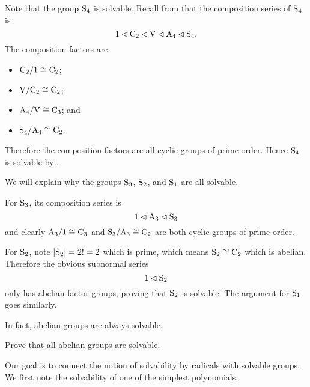 \begin{example}
    Note that the group $\mathrm{S}_{4}$ is solvable. Recall from   that the composition series of $\mathrm{S}_{4}$ is
    \[
        1 \lhd \mathrm{C}_{2} \lhd \mathrm{V} \lhd \mathrm{A}_{4} \lhd \mathrm{S}_{4}.
    \]
    The composition factors are
    \begin{itemize}
        \item $\mathrm{C}_{2}/1 \cong \mathrm{C}_{2}$;
        \item $\mathrm{V}/\mathrm{C}_{2} \cong \mathrm{C}_{2}$;
        \item $\mathrm{A}_{4}/\mathrm{V} \cong \mathrm{C}_{3}$; and
        \item $\mathrm{S}_{4}/\mathrm{A}_{4} \cong \mathrm{C}_{2}$.
    \end{itemize}
    Therefore the composition factors are all cyclic groups of prime order. Hence $\mathrm{S}_{4}$ is solvable by .
\end{example}

\begin{example}
    We will explain why the groups $\mathrm{S}_{3}$, $\mathrm{S}_{2}$, and $\mathrm{S}_{1}$ are all solvable.

    For $\mathrm{S}_{3}$, its composition series is
    \[
        1 \lhd \mathrm{A}_{3} \lhd \mathrm{S}_{3}
    \]
    and clearly $\mathrm{A}_{3}/1 \cong \mathrm{C}_{3}$ and $\mathrm{S}_{3}/\mathrm{A}_{3} \cong \mathrm{C}_{2}$ are both cyclic groups of prime order.

    For $\mathrm{S}_{2}$, note $|\mathrm{S}_{2}| = 2! = 2$ which is prime, which means $\mathrm{S}_{2} \cong \mathrm{C}_{2}$ which is abelian. Therefore the obvious subnormal series
    \[
        1 \lhd \mathrm{S}_{2}
    \]
    only has abelian factor groups, proving that $\mathrm{S}_{2}$ is solvable. The argument for $\mathrm{S}_{1}$ goes similarly.
\end{example}

\pagebreak

In fact, abelian groups are always solvable.

\begin{exercise}\label{exercise-abelian-groups-are-solvable}
    Prove that all abelian groups are solvable.
\end{exercise}

Our goal is to connect the notion of solvability by radicals with solvable groups. We first note the solvability of one of the simplest polynomials.

